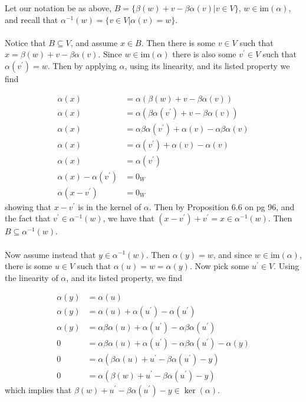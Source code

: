 \documentclass{article}
\begin{document}
\begin{solution}
Let our notation be as above, $B = \{ \beta(w) +v -\beta\alpha(v) \vert v \in V \}$, $w \in \text{im}(\alpha)$, and recall that $\alpha^{-1}(w) = \{ v \in V \vert \alpha(v) = w \}$.

\paragraph{}
Notice that $B \subseteq V$, and assume $x \in B$. Then there is some $v \in V$ such that $x = \beta(w) +v -\beta\alpha(v)$. Since $w\in\text{im}(\alpha)$ there is also some $v^{\prime} \in V$ such that $\alpha(v^{\prime}) = w$. Then by applying $\alpha$, using its linearity, and its listed property we find

\begin{align*}
\alpha(x) &= \alpha(\beta(w) +v -\beta\alpha(v))\\
\alpha(x) &= \alpha(\beta\alpha(v^{\prime}) +v -\beta\alpha(v))\\
\alpha(x) &= \alpha\beta\alpha(v^{\prime}) +\alpha(v) -\alpha\beta\alpha(v)\\
\alpha(x) &= \alpha(v^{\prime}) +\alpha(v) -\alpha(v)\\
\alpha(x) &= \alpha(v^{\prime})\\
\alpha(x) -\alpha(v^{\prime}) &= 0_{W}\\
\alpha(x -v^{\prime}) &= 0_{W}
\end{align*}
showing that $x -v^{\prime}$ is in the kernel of $\alpha$. Then by Proposition 6.6 on pg 96, and the fact that $v^{\prime} \in \alpha^{-1}(w)$, we have that $(x -v^{\prime}) +v^{\prime} = x \in \alpha^{-1}(w)$. Then $B\subseteq \alpha^{-1}(w)$.

\paragraph{}
Now assume instead that $y \in \alpha^{-1}(w)$. Then $\alpha(y) = w$, and since $w\in\text{im}(\alpha)$, there is some $u \in V$ such that $\alpha(u) = w = \alpha(y)$. Now pick some $u^{\prime} \in V$. Using the linearity of $\alpha$, and its listed property, we find

\begin{align*}
\alpha(y) &= \alpha(u) \\
\alpha(y) &= \alpha(u) + \alpha(u^{\prime}) - \alpha(u^{\prime})\\
\alpha(y) &= \alpha\beta\alpha(u) + \alpha(u^{\prime}) - \alpha\beta\alpha(u^{\prime})\\
0 &= \alpha\beta\alpha(u) + \alpha(u^{\prime}) - \alpha\beta\alpha(u^{\prime}) - \alpha(y)\\
0 &= \alpha(\beta\alpha(u) + u^{\prime} - \beta\alpha(u^{\prime}) - y)\\
0 &= \alpha(\beta(w) + u^{\prime} - \beta\alpha(u^{\prime}) - y)
\end{align*}
which implies that $\beta(w) + u^{\prime} - \beta\alpha(u^{\prime}) -y \in \ker(\alpha)$. 


\end{solution}
\end{document}
